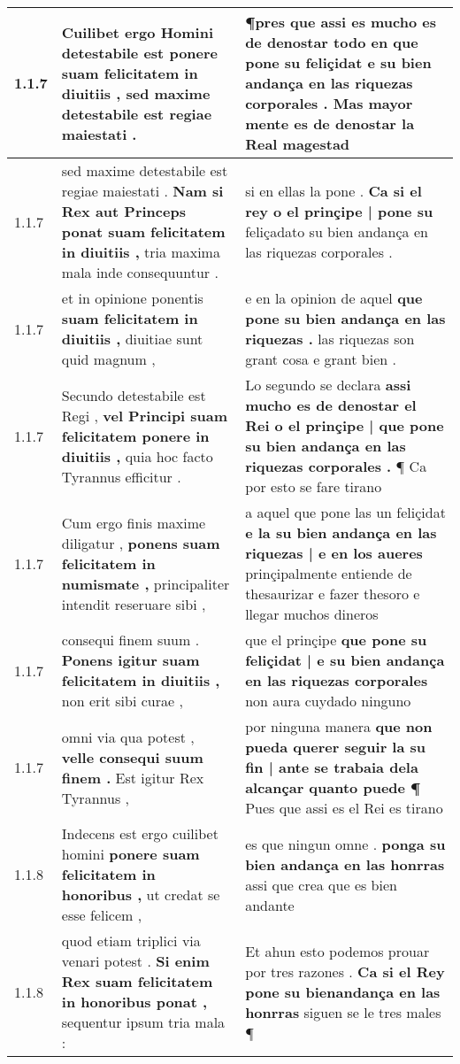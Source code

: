 \begin{tabular}{|p{1cm}|p{6.5cm}|p{6.5cm}|}
1.1.7 & Cuilibet ergo Homini detestabile est \textbf{ ponere suam felicitatem in diuitiis , } sed maxime detestabile est regiae maiestati . & ¶pres que assi es mucho es de denostar todo en que pone su feliçidat \textbf{ e su bien andança en las riquezas corporales . } Mas mayor mente es de denostar la Real magestad \\\hline
1.1.7 & sed maxime detestabile est regiae maiestati . \textbf{ Nam si Rex aut Princeps ponat suam felicitatem in diuitiis , } tria maxima mala inde consequuntur . & si en ellas la pone . \textbf{ Ca si el rey o el prinçipe | pone su } feliçadato su bien andança en las riquezas corporales . \\\hline
1.1.7 & et in opinione ponentis \textbf{ suam felicitatem in diuitiis , } diuitiae sunt quid magnum , & e en la opinion de aquel \textbf{ que pone su bien andança en las riquezas . } las riquezas son grant cosa e grant bien . \\\hline
1.1.7 & Secundo detestabile est Regi , \textbf{ vel Principi suam felicitatem ponere in diuitiis , } quia hoc facto Tyrannus efficitur . & Lo segundo se declara \textbf{ assi mucho es de denostar el Rei o el prinçipe | que pone su bien andança en las riquezas corporales . } ¶ Ca por esto se fare tirano \\\hline
1.1.7 & Cum ergo finis maxime diligatur , \textbf{ ponens suam felicitatem in numismate , } principaliter intendit reseruare sibi , & a aquel que pone las un feliçidat \textbf{ e la su bien andança en las riquezas | e en los aueres } prinçipalmente entiende de thesaurizar e fazer thesoro e llegar muchos dineros \\\hline
1.1.7 & consequi finem suum . \textbf{ Ponens igitur suam felicitatem in diuitiis , } non erit sibi curae , & que el prinçipe \textbf{ que pone su feliçidat | e su bien andança en las riquezas corporales } non aura cuydado ninguno \\\hline
1.1.7 & omni via qua potest , \textbf{ velle consequi suum finem . } Est igitur Rex Tyrannus , & por ninguna manera \textbf{ que non pueda querer seguir la su fin | ante se trabaia dela alcançar quanto puede ¶ } Pues que assi es el Rei es tirano \\\hline
1.1.8 & Indecens est ergo cuilibet homini \textbf{ ponere suam felicitatem in honoribus , } ut credat se esse felicem , & es que ningun omne . \textbf{ ponga su bien andança en las honrras } assi que crea que es bien andante \\\hline
1.1.8 & quod etiam triplici via venari potest . \textbf{ Si enim Rex suam felicitatem in honoribus ponat , } sequentur ipsum tria mala : & Et ahun esto podemos prouar por tres razones . \textbf{ Ca si el Rey pone su bienandança en las honrras } siguen se le tres males ¶ \\\hline

\end{tabular}
